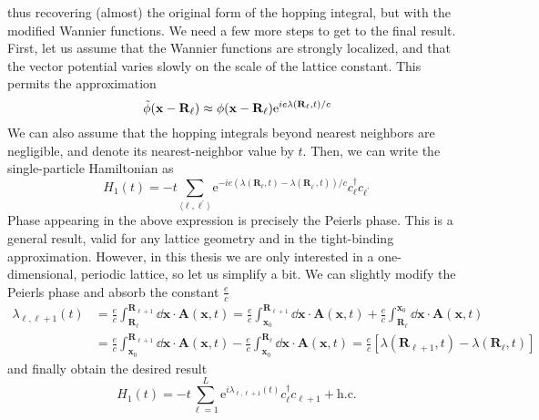 thus recovering (almost) the original form of the hopping integral, but with the modified Wannier functions.
We need a few more steps to get to the final result. First, let us assume that the Wannier functions
are strongly localized, and that the vector potential varies slowly on the scale of the lattice constant.
This permits the approximation
\begin{equation}
    \Tilde{\phi}(\mathbf{x - \mathbf{R}_{\ell}}) \approx \phi(\mathbf{x - \mathbf{R}_{\ell}}) \mathrm{e}^{i e \lambda(\mathbf{R}_{\ell} ,t) / c}
\end{equation}
We can also assume that the hopping integrals beyond nearest neighbors are negligible, and denote
its nearest-neighbor value by \(t\). Then, we can write the single-particle Hamiltonian as
\begin{equation}
    H_1(t) = -t \sum_{\langle \ell,\ell^{\prime} \rangle } \mathrm{e}^{-i e \left( \lambda(\mathbf{R}_{\ell},t) -
    \lambda (\mathbf{R}_{\ell^{\prime}},t) \right) /c } c^{\dag}_{\ell}c_{\ell^{\prime}}
\end{equation}
Phase appearing in the above expression is precisely the Peierls phase. This is a general result, valid for
any lattice geometry and in the tight-binding approximation. However, in this thesis we are only interested in a
one-dimensional, periodic lattice, so let us simplify a bit. We can slightly modify the Peierls phase
and absorb the constant \(\frac{e}{c}\)
\begin{align}
    \lambda_{\ell,\ell+1}(t) & = \frac{e}{c} \int_{\mathbf{R}_{\ell}}^{\mathbf{R}_{\ell+1}} \dd{\mathbf{x}} \cdot \mathbf{A}(\mathbf{x},t)
    = \frac{e}{c} \int_{\mathbf{x}_0}^{\mathbf{R}_{\ell+1}} \dd{\mathbf{x}} \cdot \mathbf{A}(\mathbf{x},t) + \frac{e}{c} \int_{\mathbf{R}_{\ell}}^{\mathbf{x}_0} \dd{\mathbf{x}} \cdot \mathbf{A}(\mathbf{x},t) \nonumber               \\
                             & = \frac{e}{c} \int^{\mathbf{R}_{\ell+1}}_{\mathbf{x}_0} \dd{\mathbf{x}}\cdot \mathbf{A}(\mathbf{x},t)- \frac{e}{c} \int_{\mathbf{x}_0}^{\mathbf{R}_{\ell}} \dd{\mathbf{x}}\cdot \mathbf{A}(\mathbf{x},t)
    = \frac{e}{c}\left[ \lambda(\mathbf{R}_{\ell+1},t) - \lambda(\mathbf{R}_{\ell},t) \right]
    \label{eq:peierls_phase}
\end{align}
and finally obtain the desired result
\begin{equation}
    H_1(t) = -t \sum_{ \ell=1}^{L} \mathrm{e}^{i \lambda_{\ell,\ell+1}(t) } c^{\dag}_{\ell}c_{\ell+1} + \mathrm{h.c.}
    \label{eq:peierls_hamiltonian}
\end{equation}
